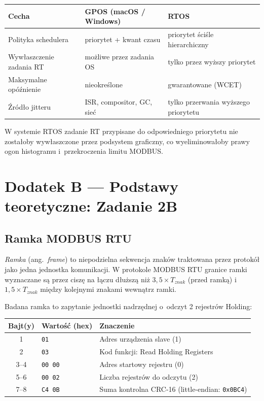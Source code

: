 \documentclass[12pt,a4paper]{article}
\begin{document}
\begin{center}
\begin{tabular}{lll}
\toprule
Cecha & GPOS (macOS / Windows) & RTOS \\
\midrule
Polityka schedulera & priorytet + kwant czasu & priorytet ściśle hierarchiczny \\
Wywłaszczenie zadania RT & możliwe przez zadania OS & tylko przez wyższy priorytet \\
Maksymalne opóźnienie & nieokreślone & gwarantowane (WCET) \\
Źródło jitteru & ISR, compositor, GC, sieć & tylko przerwania wyższego priorytetu \\
\bottomrule
\end{tabular}
\end{center}

W systemie RTOS zadanie RT przypisane do odpowiedniego priorytetu nie zostałoby
wywłaszczone przez podsystem graficzny, co wyeliminowałoby prawy ogon histogramu
i~przekroczenia limitu MODBUS.


\section*{Dodatek B — Podstawy teoretyczne: Zadanie 2B}

\subsection*{Ramka MODBUS RTU}

\textit{Ramka} (ang.\ \textit{frame}) to niepodzielna sekwencja znaków
traktowana przez protokół jako jedna jednostka komunikacji. W protokole
MODBUS RTU granice ramki wyznaczane są przez ciszę na łączu dłuższą niż
$3{,}5 \times T_{znak}$ (przed ramką) i~$1{,}5 \times T_{znak}$ między
kolejnymi znakami wewnątrz ramki.

Badana ramka to zapytanie jednostki nadrzędnej o~odczyt 2 rejestrów Holding:

\begin{center}
\begin{tabular}{cll}
\toprule
Bajt(y) & Wartość (hex) & Znaczenie \\
\midrule
1   & \texttt{01}      & Adres urządzenia slave (1) \\
2   & \texttt{03}      & Kod funkcji: Read Holding Registers \\
3--4 & \texttt{00 00}  & Adres startowy rejestru (0) \\
5--6 & \texttt{00 02}  & Liczba rejestrów do odczytu (2) \\
7--8 & \texttt{C4 0B}  & Suma kontrolna CRC-16 (little-endian: \texttt{0x0BC4}) \\
\bottomrule
\end{tabular}
\end{center}
\end{document}
